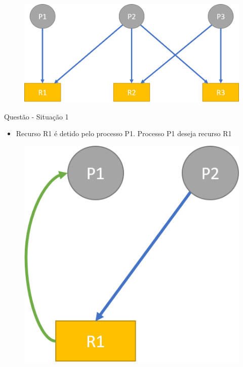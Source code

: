\documentclass[aspectratio=169,
				xcolor=table]{beamer}
\begin{document}
	\begin{frame}
		\begin{figure}
			\centering
			\includegraphics[keepaspectratio, width=0.9\paperwidth]{../figs/cap07/exercicio01.png}			
		\end{figure}		
	\end{frame}
		
	\begin{frame}{Questão - Situação 1}
		\begin{itemize}
			\item Recurso R1 é detido pelo processo P1. Processo P1 deseja recurso R1
		\end{itemize}
		\begin{figure}
			\centering
			\includegraphics[keepaspectratio, height=0.7\paperheight]{../figs/cap07/exercicio02.png}			
		\end{figure}		
	\end{frame}
\end{document}
